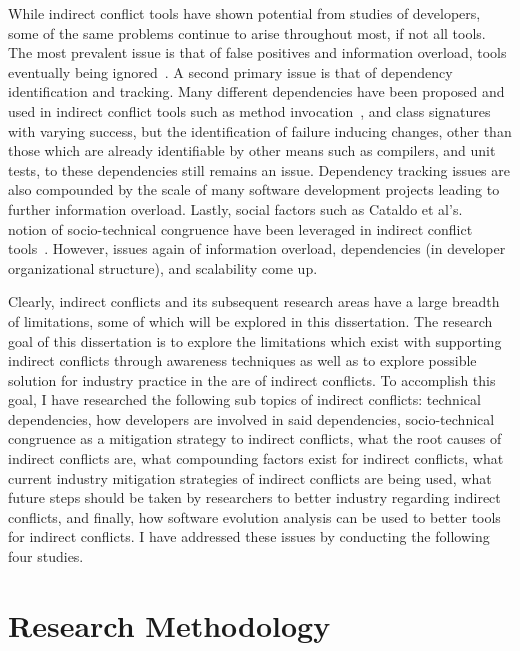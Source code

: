 While indirect conflict tools have shown potential from studies of developers, some of the same problems continue
to arise throughout most, if not all tools. The most prevalent issue is that of false positives and information
overload, tools eventually being
ignored~\cite{Sarma:2007:TSA, Servant:2010:CPI}. A second primary issue is that of dependency identification and
tracking. Many different dependencies have been proposed and used in indirect conflict tools such as method 
invocation~\cite{Trainer:2005:BGT}, and class signatures~\cite{Sarma:2007:TSA} with varying success, but the 
identification of failure inducing changes, other than those which are already identifiable by other means such
as compilers, and unit tests, to these dependencies still remains an issue. Dependency tracking issues are
also compounded by the scale of many software development projects leading to further information overload.
Lastly, social factors such as Cataldo et al's.~\cite{Cataldo:2006:ICR} notion of socio-technical
congruence have been leveraged in indirect conflict tools~\cite{Kwan:2011:ESC, Begel:2010:CDE, Borici:2012:CHA}.
However, issues again of information overload, dependencies (in developer organizational structure), and scalability 
come up.

Clearly, indirect conflicts and its subsequent research areas have a large breadth of limitations, some of which
will be explored in this dissertation. The research goal of this dissertation is to explore the limitations which exist
with supporting indirect conflicts through awareness techniques as well as to explore possible solution for industry practice 
in the are of indirect conflicts. To accomplish this goal, I have researched the following sub topics of indirect
conflicts: technical dependencies, how developers are involved in said dependencies,
socio-technical congruence as a mitigation strategy to indirect conflicts, what the root causes of indirect conflicts are,
what compounding factors exist for indirect conflicts, what current industry mitigation strategies of indirect conflicts
are being used, what future steps should be taken by researchers to better industry regarding indirect conflicts, and finally,
how software evolution analysis can be used to better tools for indirect conflicts. I have addressed these issues by
conducting the following four studies.

\section{Research Methodology}

